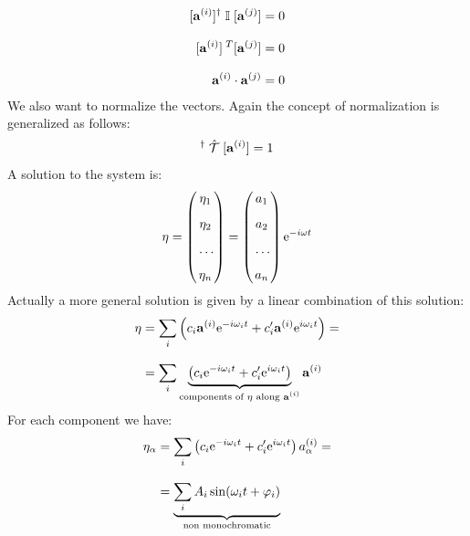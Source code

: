 \begin{equation}
    \begin{split}
        [\vb{a}^{(i)}]^{\dagger}\;\mathbb{I}\;[\vb{a}^{(j)}] &= 0\\[8pt]
        [\vb{a}^{(i)}]^{\;T} [\vb{a}^{(j)}] &= 0 \\[8pt]
        \vb{a}^{(i)}\cdot \vb{a}^{(j)} &= 0
    \end{split}
\end{equation}
We also want to normalize the vectors. Again the concept of normalization is generalized as follows:
\begin{equation}
    [\vec{a}^{(i)}]^{\dagger}\;\hat{\Telegant}\;[\vec{a}^{(i)}] = 1
\end{equation}
A solution to the system is:
\begin{equation}
    \vb{\eta} = \begin{pmatrix}
        \eta_1\\[8pt]
        \eta_2\\[8pt]
         \,\dots\, \\[8pt]
        \eta_n
    \end{pmatrix}
    =
    \begin{pmatrix}
        a_1\\[8pt]
        a_2\\[8pt]
         \,\dots\, \\[8pt]
        a_n
    \end{pmatrix}\mathrm{e}^{-i\omega t}
\end{equation}
Actually a more general solution is given by a linear combination of this solution:
\begin{equation}
    \begin{split}
        \vb{\eta} &= \displaystyle\sum_i\left(c_i \vb{a}^{(i)} \mathrm{e}^{-i\omega_i t} + c_i' \vb{a}^{(i)} \mathrm{e}^{i\omega_i t}\right) =\\[8pt]
        &= \displaystyle\sum_i \underbrace{\left(c_i \mathrm{e}^{-i\omega_i t} + c_i' \mathrm{e}^{i\omega_i t}\right)}_{\text{components of $\vb{\eta}$ along $\vb{a}^{(i)}$}}\vb{a}^{(i)}
    \end{split}
\end{equation}
For each component we have:
\begin{equation}
    \begin{split}
        \eta_{\alpha} &= \displaystyle\sum_i \left(c_i \mathrm{e}^{-i\omega_i t} + c_i' \mathrm{e}^{i\omega_i t}\right)a_{\alpha}^{(i)} =\\[8pt]
        &=  \underbrace{\displaystyle\sum_i A_i \sin(\omega_i t + \varphi_i)}_{\text{non monochromatic}}
    \end{split}
\end{equation}
